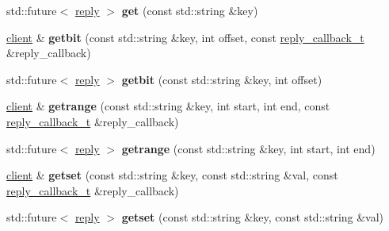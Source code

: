 \begin{DoxyCompactItemize}
\item 
\mbox{\label{classcpp__redis_1_1client_af2f987e43e139b21df2138a541b766f8}} 
std\+::future$<$ \hyperlink{classcpp__redis_1_1reply}{reply} $>$ {\bfseries get} (const std\+::string \&key)
\item 
\mbox{\label{classcpp__redis_1_1client_ad57b10f052814a2a15d4687e34d2be72}} 
\hyperlink{classcpp__redis_1_1client}{client} \& {\bfseries getbit} (const std\+::string \&key, int offset, const \hyperlink{classcpp__redis_1_1client_a061a1140d36d2eaeda82b09a0bb3f9f2}{reply\+\_\+callback\+\_\+t} \&reply\+\_\+callback)
\item 
\mbox{\label{classcpp__redis_1_1client_a43caae473008353b5ddc74a8fb36298c}} 
std\+::future$<$ \hyperlink{classcpp__redis_1_1reply}{reply} $>$ {\bfseries getbit} (const std\+::string \&key, int offset)
\item 
\mbox{\label{classcpp__redis_1_1client_a28b3fe6983918c6fc5549f1310742df1}} 
\hyperlink{classcpp__redis_1_1client}{client} \& {\bfseries getrange} (const std\+::string \&key, int start, int end, const \hyperlink{classcpp__redis_1_1client_a061a1140d36d2eaeda82b09a0bb3f9f2}{reply\+\_\+callback\+\_\+t} \&reply\+\_\+callback)
\item 
\mbox{\label{classcpp__redis_1_1client_a3a0ed59f7fc32ba22c1a9be3c02e5468}} 
std\+::future$<$ \hyperlink{classcpp__redis_1_1reply}{reply} $>$ {\bfseries getrange} (const std\+::string \&key, int start, int end)
\item 
\mbox{\label{classcpp__redis_1_1client_a124dca021c3aedd3f8cbb52263e7fec8}} 
\hyperlink{classcpp__redis_1_1client}{client} \& {\bfseries getset} (const std\+::string \&key, const std\+::string \&val, const \hyperlink{classcpp__redis_1_1client_a061a1140d36d2eaeda82b09a0bb3f9f2}{reply\+\_\+callback\+\_\+t} \&reply\+\_\+callback)
\item 
\mbox{\label{classcpp__redis_1_1client_abcbf060105acb8b1d7b14a5102be19a0}} 
std\+::future$<$ \hyperlink{classcpp__redis_1_1reply}{reply} $>$ {\bfseries getset} (const std\+::string \&key, const std\+::string \&val)

\end{DoxyCompactItemize}
